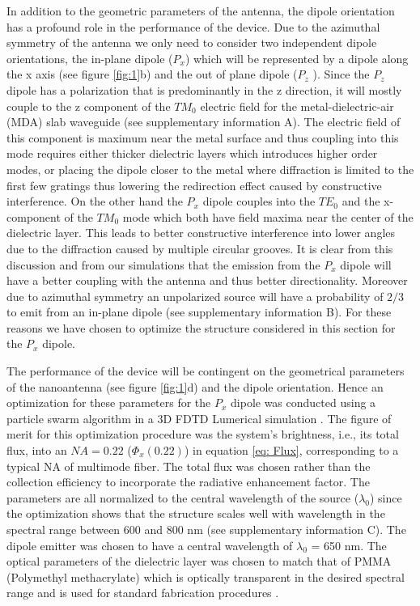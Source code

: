 \documentclass[10pt,onecolumn ]{article}
\begin{document}
In addition to the geometric parameters of the antenna, the dipole orientation has a profound role in the performance of the device.
Due to the azimuthal symmetry of the antenna we only need to consider two independent dipole orientations, the in-plane dipole ($P_x$)  which will be represented by a dipole  along the x axis (see figure \ref{fig:1}b)  and the out of plane dipole ($P_z$ ).
Since the $P_z$ dipole has a polarization that is predominantly in the z direction, it will mostly couple to the z component of the $TM_0$ electric field for the metal-dielectric-air (MDA) slab waveguide (see supplementary information A). 
The electric field of this component is maximum near the metal surface and thus coupling into this mode requires either thicker dielectric layers which introduces higher order modes, or placing the dipole closer to the metal where diffraction is limited to the first few gratings thus lowering the redirection effect caused by constructive interference. 
On the other hand the $P_x$ dipole couples into the $TE_0$ and the x-component of the $TM_0$ mode which both have field maxima near the center of the dielectric layer. This leads to better constructive interference into lower angles due to the diffraction caused by multiple circular grooves. 
It is clear from this discussion and from our simulations that the emission from the $P_x$ dipole will have a better coupling with the antenna and thus better directionality. 
Moreover due to azimuthal symmetry an unpolarized source will have a probability of $2/3$ to emit from an in-plane dipole (see supplementary information B). 
For these reasons we have chosen to optimize the structure considered in this section for the $P_x$ dipole.

The performance of the device will be contingent on the geometrical parameters of the nanoantenna (see figure \ref{fig:1}d) and the dipole orientation. 
Hence an optimization for these parameters for the $P_x$ dipole was conducted using a particle swarm algorithm \cite{Robinson2004ParticleElectromagnetics} in a  3D FDTD Lumerical\textsuperscript{\textregistered} simulation \cite{LumericalInc.}. 
The figure of merit for this optimization procedure was the system's brightness, i.e., its total flux, into an $NA = 0.22$   ($\Phi_x(0.22)$) in equation \ref{eq: Flux}, corresponding to a typical NA of multimode fiber.
The total flux was chosen rather than the collection efficiency to incorporate the radiative enhancement factor.
The parameters are all normalized to the central wavelength of the source ($\lambda_0$) since the optimization shows that the structure scales well with wavelength in the spectral range between 600 and 800 nm (see supplementary information C). The dipole emitter was chosen to have a central wavelength of $\lambda_0$ = 650 nm.
The optical parameters of the dielectric layer was chosen to match that of PMMA (Polymethyl methacrylate) which is optically transparent in the desired spectral range and is used for standard fabrication procedures \cite{Harats2017DesignEmission}. 
\end{document}
